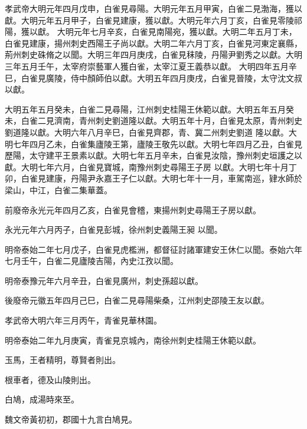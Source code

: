 \begin{pinyinscope}
 孝武帝大明元年四月戊申，白雀見尋陽。大明元年五月甲寅，白雀二見渤海，獲以獻。大明元年五月甲子，白雀見建康，獲以獻。大明元年六月丁亥，白雀見零陵祁陽，獲以獻。
 大明元年七月辛亥，白雀見南陽宛，獲以獻。大明二年五月丁未，白雀見建康，揚州刺史西陽王子尚以獻。大明二年六月丁亥，白雀見河東定襄縣，荊州刺史硃脩之以聞。大明三年四月庚戌，白雀見秣陵，丹陽尹劉秀之以獻。大明三年五月壬午，太宰府崇藝軍人獲白雀，太宰江夏王義恭以獻。
 大明四年五月辛巳，白雀見廣陵，侍中顏師伯以獻。大明五年四月庚戌，白雀見晉陵，太守沈文叔以獻。



 大明五年五月癸未，白雀二見尋陽，江州刺史桂陽王休範以獻。大明五年五月癸未，白雀二見濟南，青州刺史劉道隆以獻。大明五年十月，白雀見太原，青州刺史劉道隆以獻。大明六年八月辛巳，白雀見齊郡，青、冀二州刺史劉道
 隆以獻。大明七年四月乙未，白雀集廬陵王第，廬陵王敬先以獻。大明七年四月乙丑，白雀見歷陽，太守建平王景素以獻。大明七年五月辛未，白雀見汝陰，豫州刺史垣護之以獻。大明七年六月，白雀見寶城，南豫州刺史尋陽王子房
 以獻。大明七年十月丁卯，白雀見建康，丹陽尹永嘉王子仁以獻。大明七年十一月，車駕南巡，肄水師於梁山，中江，白雀二集華蓋。



 前廢帝永光元年四月乙亥，白雀見會稽，東揚州刺史尋陽王子房以獻。



 永光元年六月丙子，白雀見彭城，徐州刺史義陽王昶
 以聞。



 明帝泰始二年七月戊子，白雀見虎檻洲，都督征討諸軍建安王休仁以聞。泰始六年七月壬午，白雀二見廬陵吉陽，內史江孜以聞。



 明帝泰豫元年六月辛丑，白雀見廣州，刺史孫超以獻。



 後廢帝元徽五年四月己巳，白雀二見尋陽柴桑，江州刺史邵陵王友以獻。



 孝武帝大明六年三月丙午，青雀見華林園。



 明帝泰始二年九月庚寅，青雀見京城內，南徐州刺史桂陽王休範以獻。


玉馬，王者精明，尊賢者則出。


根車者，德及山陵則出。



 白鳩，成湯時來至。



 魏文帝黃初初，郡國十九言白鳩見。




\end{pinyinscope}
